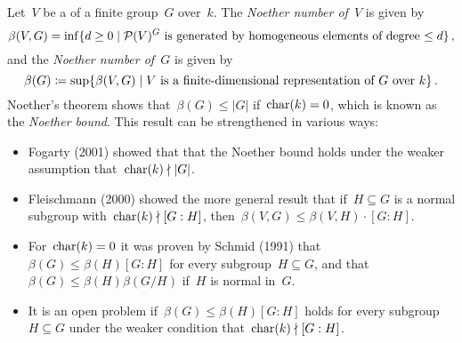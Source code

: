 \begin{remark}
  Let~$V$ be a {\fd} of a finite group~$G$ over~$k$.
  The \emph{Noether number of~$V$} is given by
  \[
    \beta(V,G)
      =
    \inf
    \{
      d \geq 0
    \suchthat
      \text{$\Pol(V)^G$ is generated by homogeneous elements of degree~$\leq d$}
    \} \,,
  \]
  and the \emph{Noether number of~$G$} is given by
  \[
    \beta(G)
      \defined
    \sup
    \{
      \beta(V,G)
    \suchthat
      \text{$V$ is a {\fd} representation of~$G$ over~$k$}
    \} \,.
  \]
  Noether’s theorem shows that~$\beta(G) \leq |G|$ if~$\operatorname{char}(k) = 0$, which is known as the \emph{Noether bound}.
  This result can be strengthened in various ways:
  \begin{itemize}
    \item
      Fogarty (2001) showed that that the Noether bound holds under the weaker assumption that~$\operatorname{char}(k) \nmid \lvert G\rvert$.
    \item
      Fleischmann (2000) showed the more general result that if~$H \subseteq G$ is a normal subgroup with~$\operatorname{char}(k) \nmid [G : H]$, then~$\beta(V,G) \leq \beta(V,H) \cdot [G : H]$.
    \item
      For~$\operatorname{char}(k) = 0$ it was proven by Schmid (1991) that~$\beta(G) \leq \beta(H)[G : H]$ for every subgroup~$H \subseteq G$, and that~$\beta(G) \leq \beta(H)\beta(G/H)$ if~$H$ is normal in~$G$.
    \item
      It is an open problem if~$\beta(G) \leq \beta(H)[G : H]$ holds for every subgroup~$H \subseteq G$ under the weaker condition that~$\operatorname{char}(k) \nmid [G : H]$.
  \end{itemize}
\end{remark}





